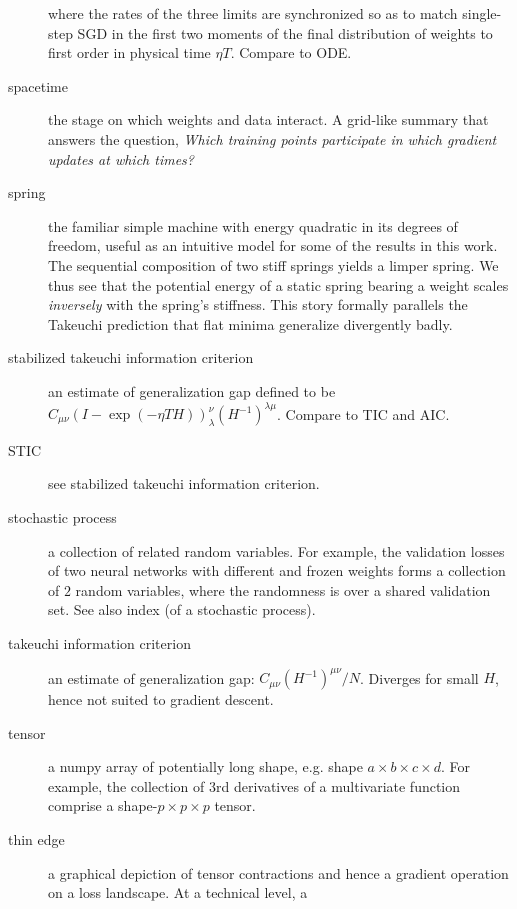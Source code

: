 \documentclass{article}
\theoremstyle{plain}
\theoremstyle{definition}
\newcommand{\wrap}[1]{\left(#1\right)}
\begin{document}
\begin{description}
            where the rates of the three limits are synchronized so as to match
            single-step SGD in the first two moments of the final distribution
            of weights to first order in physical time $\eta T$.  Compare to
            ODE.
        \item[spacetime] the stage on which weights and data interact.  A
            grid-like summary that answers the question, \emph{Which training
            points participate in which gradient updates at which times?}
        \item[spring] the familiar simple machine with energy quadratic in its
            degrees of freedom, useful as an intuitive model for some of the
            results in this work.  The sequential composition of two stiff
            springs yields a limper spring.  We thus see that the potential
            energy of a static spring bearing a weight scales \emph{inversely}
            with the spring's stiffness.  This story formally parallels the
            Takeuchi prediction that flat minima generalize divergently badly.
        \item[stabilized takeuchi information criterion] an estimate of
            generalization gap defined to be $C_{\mu\nu}\wrap{ I - \exp(-\eta T
            H) }^{\nu}_{\lambda}\wrap{H^{-1}}^{\lambda\mu}$.  Compare to
            TIC and AIC.
        \item[STIC] see stabilized takeuchi information criterion.
        \item[stochastic process] a collection of related random variables.
            For example, the validation losses of two neural networks with
            different and frozen weights forms a collection of $2$ random
            variables, where the randomness is over a shared validation set.
            See also index (of a stochastic process).
        \item[takeuchi information criterion] an estimate of generalization
            gap: $C_{\mu\nu}(H^{-1})^{\mu\nu}/N$.  Diverges for small $H$,
            hence not suited to gradient descent.
        \item[tensor] a numpy array of potentially long shape, e.g. shape
            $a\times b\times c\times d$.  For example, the collection of $3$rd
            derivatives of a multivariate function comprise a shape-$p\times
            p\times p$ tensor. 
        \item[thin edge] a graphical depiction of tensor contractions and hence
            a gradient operation on a loss landscape.  At a technical level, a

\end{description}
\end{document}
